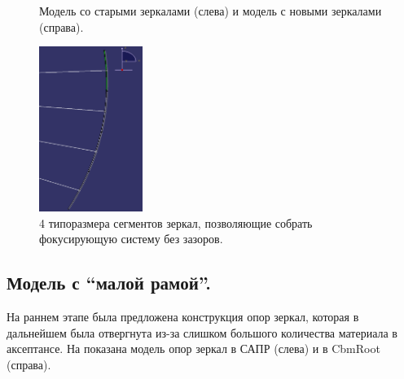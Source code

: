 \begin{figure}[H]
\begin{minipage}[b]{0.495\textwidth}
\end{minipage}
\caption{Модель со старыми зеркалами (слева) и модель с новыми зеркалами (справа).}
\label{fig:MCgeoMirrorsEvolution}
\end{figure}

\begin{figure}[H]
\centering
\includegraphics[width=0.3\textwidth]{pictures/Mirrors_4types_of_segments.png}
\caption{4 типоразмера сегментов зеркал, позволяющие собрать фокусирующую систему без зазоров.}
\label{fig:Mirrors4types}
\end{figure}

\subsection{Модель с ``малой рамой''.}

На раннем этапе была предложена конструкция опор зеркал, которая в дальнейшем была отвергнута из-за слишком большого количества материала в аксептансе. На  показана модель опор зеркал в САПР (слева) и в CbmRoot (справа).

